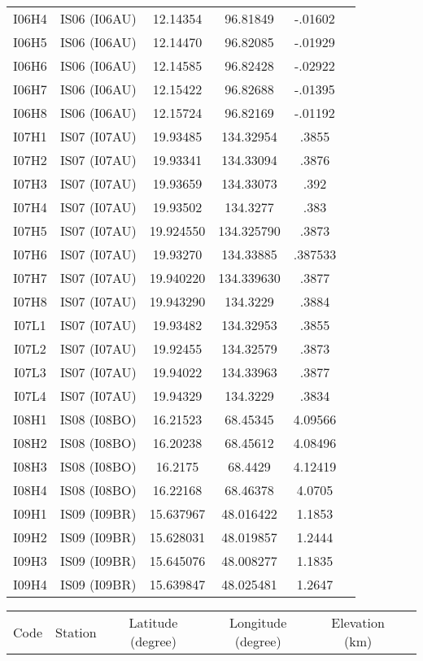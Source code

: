 \documentclass[a4paper, 10pt]{report}
\begin{document}
{\begin{center}
\begin{tabular}{|c|c|c|c|c|c|}
I06H4&	IS06 (I06AU)&	 	12.14354&	96.81849&	-.01602\\
I06H5&	IS06 (I06AU)&	 	12.14470&	96.82085&	-.01929\\
I06H6&	IS06 (I06AU)&	 	12.14585&	96.82428&	-.02922\\
I06H7&	IS06 (I06AU)&	 	12.15422&	96.82688&	-.01395\\
I06H8&	IS06 (I06AU)&	 	12.15724&	96.82169&	-.01192\\
I07H1&	IS07 (I07AU)&	 	19.93485&	134.32954&	.3855\\
I07H2&	IS07 (I07AU)&	 	19.93341&	134.33094&	.3876\\
I07H3&	IS07 (I07AU)&	 	19.93659&	134.33073&	.392\\
I07H4&	IS07 (I07AU)&	 	19.93502&	134.3277&	.383\\
I07H5&	IS07 (I07AU)&	 	19.924550&	134.325790&	.3873\\
I07H6&	IS07 (I07AU)&	 	19.93270&	134.33885&	.387533\\
I07H7&	IS07 (I07AU)&	 	19.940220&	134.339630&	.3877\\
I07H8&	IS07 (I07AU)&	 	19.943290&	134.3229&	.3884\\
I07L1&	IS07 (I07AU)&	 	19.93482&	134.32953&	.3855\\
I07L2&	IS07 (I07AU)&	 	19.92455&	134.32579&	.3873\\
I07L3&	IS07 (I07AU)&	 	19.94022&	134.33963&	.3877\\
I07L4&	IS07 (I07AU)&	 	19.94329&	134.3229&	.3834\\
I08H1&	IS08 (I08BO)&	 	16.21523&	68.45345&	4.09566\\
I08H2&	IS08 (I08BO)&	 	16.20238&	68.45612&	4.08496\\
I08H3&	IS08 (I08BO)&	 	16.2175&	68.4429&	4.12419\\
I08H4&	IS08 (I08BO)&	 	16.22168&	68.46378&	4.0705\\
I09H1&	IS09 (I09BR)&	 	15.637967&	48.016422&	1.1853\\
I09H2&	IS09 (I09BR)&	 	15.628031&	48.019857&	1.2444\\
I09H3&	IS09 (I09BR)&	 	15.645076&	48.008277&	1.1835\\
I09H4&	IS09 (I09BR)&	 	15.639847&	48.025481&	1.2647\\
\hline
\end{tabular}
\end{center}
\begin{center}
\begin{tabular}{|c|c|c|c|c|c|}
\hline
Code&	Station&	Latitude (degree)&	Longitude (degree)&	Elevation (km)\\

\end{tabular}
\end{center}}
\end{document}
